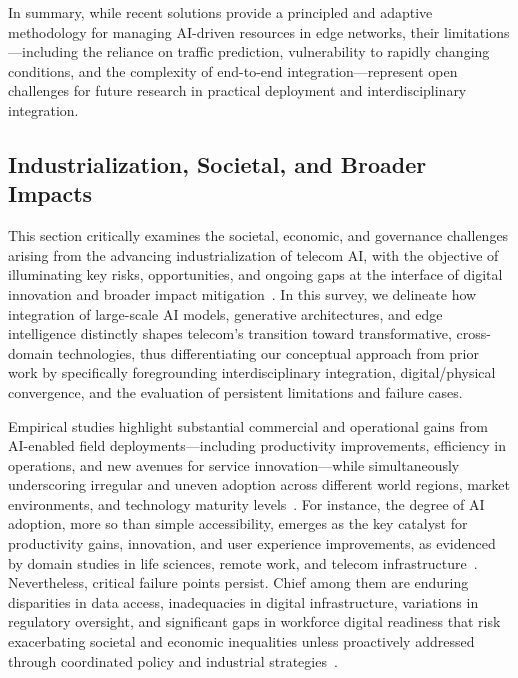 \documentclass[sigconf]{acmart}
\begin{document}
In summary, while recent solutions provide a principled and adaptive methodology for managing AI-driven resources in edge networks, their limitations—including the reliance on traffic prediction, vulnerability to rapidly changing conditions, and the complexity of end-to-end integration—represent open challenges for future research in practical deployment and interdisciplinary integration.

\subsection{Industrialization, Societal, and Broader Impacts}

This section critically examines the societal, economic, and governance challenges arising from the advancing industrialization of telecom AI, with the objective of illuminating key risks, opportunities, and ongoing gaps at the interface of digital innovation and broader impact mitigation~\cite{ref6, ref8, ref19, ref26, ref29, ref49}. In this survey, we delineate how integration of large-scale AI models, generative architectures, and edge intelligence distinctly shapes telecom's transition toward transformative, cross-domain technologies, thus differentiating our conceptual approach from prior work by specifically foregrounding interdisciplinary integration, digital/physical convergence, and the evaluation of persistent limitations and failure cases.

Empirical studies highlight substantial commercial and operational gains from AI-enabled field deployments—including productivity improvements, efficiency in operations, and new avenues for service innovation—while simultaneously underscoring irregular and uneven adoption across different world regions, market environments, and technology maturity levels~\cite{ref6, ref8, ref29}. For instance, the degree of AI adoption, more so than simple accessibility, emerges as the key catalyst for productivity gains, innovation, and user experience improvements, as evidenced by domain studies in life sciences, remote work, and telecom infrastructure~\cite{ref6, ref8, ref19}. Nevertheless, critical failure points persist. Chief among them are enduring disparities in data access, inadequacies in digital infrastructure, variations in regulatory oversight, and significant gaps in workforce digital readiness that risk exacerbating societal and economic inequalities unless proactively addressed through coordinated policy and industrial strategies~\cite{ref8, ref19}.
\end{document}
